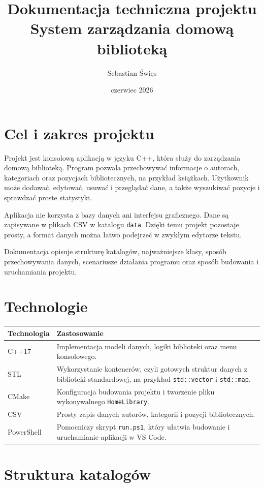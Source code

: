\documentclass[12pt,a4paper]{article}
\title{Dokumentacja techniczna projektu\\System zarządzania domową biblioteką}
\author{Sebastian Święs}
\date{czerwiec 2026}
\begin{document}
\maketitle
\tableofcontents
\newpage

\section{Cel i zakres projektu}

Projekt jest konsolową aplikacją w języku C++, która służy do zarządzania domową
biblioteką. Program pozwala przechowywać informacje o autorach, kategoriach oraz
pozycjach bibliotecznych, na przykład książkach. Użytkownik może dodawać, edytować,
usuwać i przeglądać dane, a także wyszukiwać pozycje i sprawdzać proste statystyki.

Aplikacja nie korzysta z bazy danych ani interfejsu graficznego. Dane są zapisywane
w plikach CSV w katalogu \texttt{data}. Dzięki temu projekt pozostaje prosty, a
format danych można łatwo podejrzeć w zwykłym edytorze tekstu.

Dokumentacja opisuje strukturę katalogów, najważniejsze klasy, sposób przechowywania
danych, scenariusze działania programu oraz sposób budowania i uruchamiania projektu.

\section{Technologie}

\begin{longtable}{|p{4cm}|p{10cm}|}
\hline
\textbf{Technologia} & \textbf{Zastosowanie} \\
\hline
C++17 & Implementacja modeli danych, logiki biblioteki oraz menu konsolowego. \\
\hline
STL & Wykorzystanie kontenerów, czyli gotowych struktur danych z biblioteki standardowej, na przykład \texttt{std::vector} i \texttt{std::map}. \\
\hline
CMake & Konfiguracja budowania projektu i tworzenie pliku wykonywalnego \texttt{HomeLibrary}. \\
\hline
CSV & Prosty zapis danych autorów, kategorii i pozycji bibliotecznych. \\
\hline
PowerShell & Pomocniczy skrypt \texttt{run.ps1}, który ułatwia budowanie i uruchamianie aplikacji w VS Code. \\
\hline
\end{longtable}

\section{Struktura katalogów}
\end{document}
